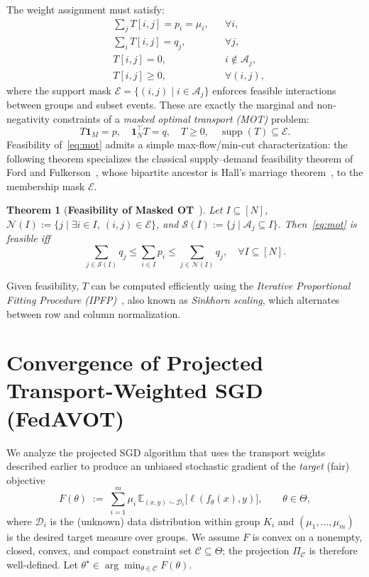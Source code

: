 \documentclass[9pt]{extarticle}
\newtheorem{theorem}{Theorem}
\theoremstyle{definition}
\begin{document}
The weight assignment must satisfy:
\begin{align}\label{eq:constraints}
    &\sum_{j}T[i,j]=p_i=\mu_i, && \forall i, \nonumber\\
    &\sum_{i}T[i,j]=q_j, && \forall j, \nonumber\\
    &T[i,j]=0, && i\notin\mathcal{A}_j, \nonumber\\
    &T[i,j]\ge0, && \forall (i,j),
\end{align}
where the support mask $\mathcal{E}=\{(i,j)\mid i\in\mathcal{A}_j\}$ enforces feasible interactions between groups and subset events. These are exactly the marginal and non-negativity constraints of a \emph{masked optimal transport (MOT)} problem:
\begin{equation}\label{eq:mot}
T\mathbf{1}_M=p, \quad \mathbf{1}_N^\top T=q, \quad T\ge0, \quad \operatorname{supp}(T)\subseteq \mathcal{E}.
\end{equation}
Feasibility of~\eqref{eq:mot} admits a simple max-flow/min-cut characterization: the following theorem specializes the classical supply--demand feasibility theorem of Ford and Fulkerson~\cite{fordfulkerson1962flows}, whose bipartite ancestor is Hall's marriage theorem~\cite{hall1935representatives}, to the membership mask $\mathcal{E}$.
\begin{theorem}[\textbf{Feasibility of Masked OT}~\cite{fordfulkerson1962flows,hall1935representatives}]
\label{thm:feasibility}
Let $I\subseteq[N]$, $\mathcal{N}(I):=\{j\mid \exists i\in I,\ (i,j)\in\mathcal{E}\}$, and $\mathcal{S}(I):=\{j\mid \mathcal{A}_j\subseteq I\}$. Then~\eqref{eq:mot} is feasible iff
\begin{equation}\label{eq:feasibility}
\sum_{j\in\mathcal{S}(I)} q_j \le \sum_{i\in I} p_i \le \sum_{j\in\mathcal{N}(I)} q_j, \quad \forall I\subseteq[N].
\end{equation}
\end{theorem}

Given feasibility, $T$ can be computed efficiently using the \textit{Iterative Proportional Fitting Procedure (IPFP)}~\cite{sinkhorn1967concerning, knight2008sinkhorn}, also known as \textit{Sinkhorn scaling}, which alternates between row and column normalization.
\section{Convergence of Projected Transport-Weighted SGD (FedAVOT)}
We analyze the projected SGD algorithm that uses the transport weights described earlier to produce an unbiased stochastic gradient of the \emph{target} (fair) objective
\begin{equation}\label{eq:target-objective}
F(\theta) \;:=\; \sum_{i=1}^m \mu_i \,\mathbb{E}_{(x,y)\sim \mathcal{D}_i}\!\big[\ell\!\left(f_\theta(x),y\right)\big],
\qquad \theta\in\Theta,
\end{equation}
where $\mathcal{D}_i$ is the (unknown) data distribution within group $K_i$ and $(\mu_1,\dots,\mu_m)$ is the desired target measure over groups. We assume $F$ is convex on a nonempty, closed, convex, and compact constraint set $\mathcal{C}\subseteq\Theta$; the projection $\Pi_{\mathcal{C}}$ is therefore well-defined. Let $\theta^\star\in\arg\min_{\theta\in\mathcal{C}}F(\theta)$.
\end{document}
